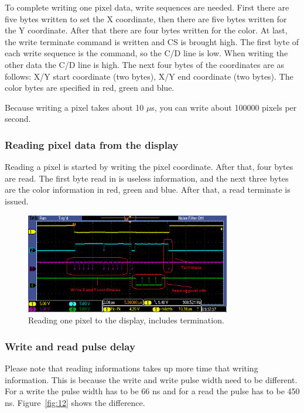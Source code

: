 \documentclass[12pt]{article}
\begin{document}
To complete writing one pixel data, write sequences are needed.
First there are five bytes written to set the X coordinate, then there are five bytes written for the Y coordinate. After that there are four bytes written for the color. At last, the write terminate command is written and CS is brought high. The first byte of each write sequence is the command, so the C/D line is low. When writing the other data the C/D line is high. The next four bytes of the coordinates are as follows: X/Y start coordinate (two bytes), X/Y end coordinate (two bytes). The color bytes are specified in red, green and blue.

Because writing a pixel takes about 10 $\mu$s, you can write about 100000 pixels per second.

\subsubsection{Reading pixel data from the display}
Reading a pixel is started by writing the pixel coordinate. After that, four bytes are read. The first byte read in is useless information, and the next three bytes are the color information in red, green and blue. After that, a read terminate is issued.

\begin{figure}[!ht]
\centering
\includegraphics[width=0.8\textwidth]{pixel_read}
\caption{Reading one pixel to the display, includes termination.}
\label{fig:11}
\end{figure}

\subsubsection{Write and read pulse delay}
Please note that reading informations takes up more time that writing information. This is because the write and write pulse width need to be different. For a write the pulse width has to be 66 ns and for a read the pulse has to be 450 ns. Figure~\ref{fig:12} shows the difference.
\end{document}
